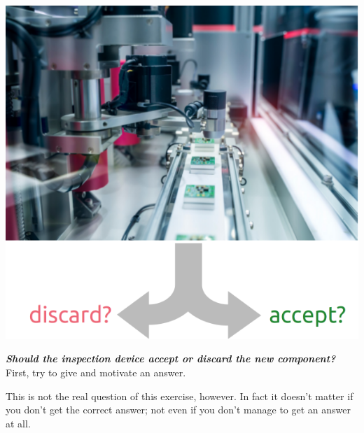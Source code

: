 \documentclass[
  a4paper,
  DIV=11,
  numbers=noendperiod,
  oneside]{scrreprt}
\begin{document}
\begin{marginfigure}

{\centering \includegraphics[width=1\textwidth,height=\textheight]{accept_discard.png}

}

\end{marginfigure}

{\textbf{\emph{Should the inspection device accept or discard the new
component?}}}\\

First, try to give and motivate an answer.

This is not the real question of this exercise, however. In fact it
doesn't matter if you don't get the correct answer; not even if you
don't manage to get an answer at all.
\end{document}
